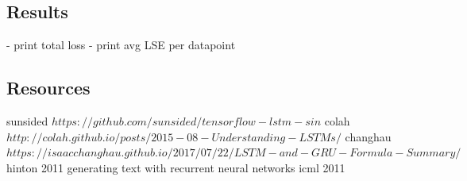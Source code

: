 \subsection{Results}
- print total loss
- print avg LSE per datapoint


\subsection{Resources}
sunsided $https://github.com/sunsided/tensorflow-lstm-sin$
colah $http://colah.github.io/posts/2015-08-Understanding-LSTMs/$
changhau $https://isaacchanghau.github.io/2017/07/22/LSTM-and-GRU-Formula-Summary/$
hinton 2011 generating text with recurrent neural networks icml 2011